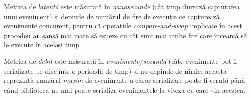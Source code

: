Metrica de \textit{latență} este măsurată în \textit{nanosecunde} (cât
timp durează capturarea unui eveniment) și depinde de numărul de fire de
execuție ce capturează evenimente concurent, pentru că operațiile
\textit{compare-and-swap} implicate în acest procedeu au șansă mai mare
să eșueze cu cât sunt mai multe fire care încearcă să le execute în
același timp.

Metrica de \textit{debit} este măsurată în \textit{evenimente/secundă}
(câte evenimente pot fi serializate pe disc într-o perioadă de timp) și
nu depinde de nimic: aceasta reprezintă numărul \textit{maxim} de
evenimente a căror serializare poate fi cerută până când biblioteca nu
mai poate serializa evenimentele la viteza cu care vin acestea.
